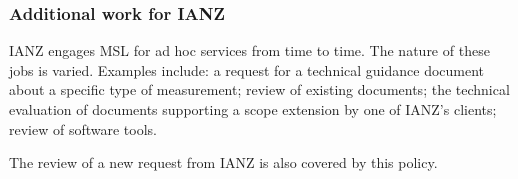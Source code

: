 \subsubsection{Additional work for IANZ}
IANZ engages MSL for ad hoc services from time to time. The nature of these jobs is varied. Examples include: a request for a technical guidance document about a specific type of measurement; review of existing documents; the technical evaluation of documents supporting a scope extension by one of IANZ’s clients; review of software tools. 

The review of a new request from IANZ is also covered by this policy.

